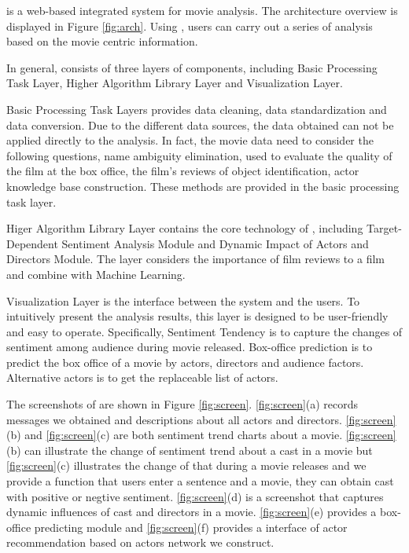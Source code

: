 \system is a web-based integrated system for movie analysis. The architecture overview is displayed in Figure \ref{fig:arch}. Using \system, users can carry out a series of analysis based on the movie centric information.
\par In general, \system consists of three layers of components, including Basic Processing Task Layer, Higher Algorithm Library Layer and Visualization Layer.
\par Basic Processing Task Layers provides data cleaning, data standardization and data conversion. Due to the different data sources, the data obtained can not be applied directly to the analysis. In fact, the movie data need to consider the following questions, name ambiguity elimination, used to evaluate the quality of the film at the box office, the film's reviews of object identification, actor knowledge base construction. These methods are provided in the basic processing task layer.
\par Higer Algorithm Library Layer contains the core technology of \system, including Target-Dependent Sentiment Analysis Module and Dynamic Impact of Actors and Directors Module. The layer considers the importance of film reviews to a film and combine with Machine Learning.
\par Visualization Layer is the interface between the system and the users. To intuitively present the analysis results, this layer is designed to be user-friendly and easy to operate. Specifically, Sentiment Tendency is to capture the changes of sentiment among audience during movie released. Box-office prediction is to predict the box office of a movie by actors, directors and audience factors. Alternative actors is to get the replaceable list of actors.
\par The screenshots of \system are shown in Figure \ref{fig:screen}. \ref{fig:screen}(a) records messages we obtained and descriptions about all actors and directors. \ref{fig:screen}(b) and \ref{fig:screen}(c) are both sentiment trend charts about a movie. \ref{fig:screen}(b) can illustrate the change of sentiment trend about a cast in a movie but \ref{fig:screen}(c) illustrates the change of that during a movie releases and we provide a function that users enter a sentence and a movie, they can obtain cast with positive or negtive sentiment. \ref{fig:screen}(d) is a screenshot that captures dynamic influences  of cast and directors in a movie. \ref{fig:screen}(e) provides a box-office predicting module and \ref{fig:screen}(f) provides a interface of actor recommendation based on actors network we construct.

